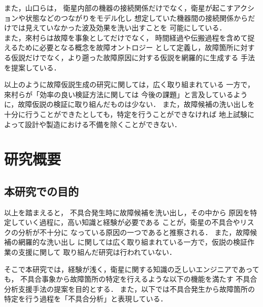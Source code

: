 \documentclass[11pt]{jsreport}
\begin{document}
また，山口ら\cite{Yamaguchi2014}は，
衛星内部の機器の接続関係だけでなく，衛星が起こすアクションや状態などのつながりをモデル化し
想定していた機器間の接続関係からだけでは見えていなかった波及効果を洗い出すことを
可能にしている．\\
また，來村ら\cite{Kitamura1999}は故障を事象としてだけでなく，
時間経過や伝搬過程を含めて捉えるために必要となる概念を故障オントロジー\cite{Ontology1998}
として定義し，故障箇所に対する仮説だけでなく，より遡った故障原因に対する仮説を網羅的に生成する
手法を提案している．\\

以上のように故障仮説生成の研究に関しては，広く取り組まれている
一方で，來村ら\cite{Kitamura1999}が「効率の良い検証方法に関しては
今後の課題」と言及しているように，故障仮説の検証に取り組んだものは少ない．
また，故障候補の洗い出しを十分に行うことができたとしても，特定を行うことができなければ
地上試験によって設計や製造における不備を除くことができない．

\section{研究概要}
\subsection{本研究での目的}
以上を踏まえると，
不具合発生時に故障候補を洗い出し，その中から
原因を特定していく過程に，高い知識と経験が必要である
ことが，衛星の不具合やリスクの分析が不十分に
なっている原因の一つであると推察される．
また，故障候補の網羅的な洗い出し
に関しては広く取り組まれている一方で，仮説の検証作業の支援に関して
取り組んだ研究は行われていない．

そこで本研究では，経験が浅く，衛星に関する知識の乏しいエンジニアであっても，
不具合事象から故障箇所の特定を行えるような以下の機能を満たす
不具合分析支援手法の提案を目的とする．
また，以下では不具合発生から故障箇所の特定を行う過程を「不具合分析」と表現している．\\
\end{document}

